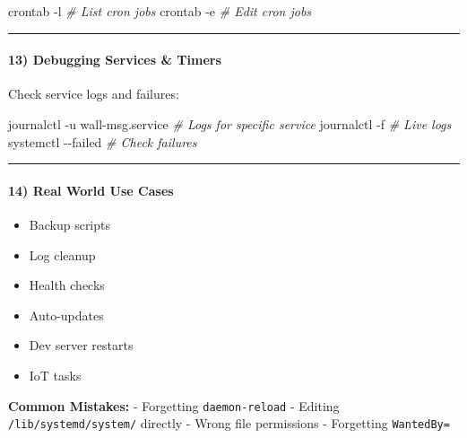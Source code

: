 \documentclass[
  english,
  paper=a4,
  oneside  ,captions=tableheading
]{scrartcl}
\newenvironment{Shaded}{}{}
\newcommand{\AttributeTok}[1]{\textcolor[rgb]{0.49,0.56,0.16}{#1}}
\newcommand{\CommentTok}[1]{\textcolor[rgb]{0.38,0.63,0.69}{\textit{#1}}}
\newcommand{\ExtensionTok}[1]{#1}
\newcommand{\FunctionTok}[1]{\textcolor[rgb]{0.02,0.16,0.49}{#1}}
\newcommand{\NormalTok}[1]{#1}
\providecommand{\tightlist}{%
  \setlength{\itemsep}{0pt}\setlength{\parskip}{0pt}}
\begin{document}
\begin{Shaded}
\begin{Highlighting}[]
\FunctionTok{crontab} \AttributeTok{{-}l}      \CommentTok{\# List cron jobs}
\FunctionTok{crontab} \AttributeTok{{-}e}      \CommentTok{\# Edit cron jobs}
\end{Highlighting}
\end{Shaded}

\begin{center}\rule{0.5\linewidth}{0.5pt}\end{center}

\paragraph{13) Debugging Services \&
Timers}\label{debugging-services-timers}

Check service logs and failures:

\begin{Shaded}
\begin{Highlighting}[]
\ExtensionTok{journalctl} \AttributeTok{{-}u}\NormalTok{ wall{-}msg.service    }\CommentTok{\# Logs for specific service}
\ExtensionTok{journalctl} \AttributeTok{{-}f}                     \CommentTok{\# Live logs}
\ExtensionTok{systemctl} \AttributeTok{{-}{-}failed}                \CommentTok{\# Check failures}
\end{Highlighting}
\end{Shaded}

\begin{center}\rule{0.5\linewidth}{0.5pt}\end{center}

\paragraph{14) Real World Use Cases}\label{real-world-use-cases}

\begin{itemize}
\tightlist
\item
  Backup scripts
\item
  Log cleanup
\item
  Health checks
\item
  Auto-updates
\item
  Dev server restarts
\item
  IoT tasks
\end{itemize}

\textbf{Common Mistakes:} - \faTimesCircle Forgetting
\texttt{daemon-reload} - \faTimesCircle Editing
\texttt{/lib/systemd/system/} directly - \faTimesCircle Wrong file
permissions - \faTimesCircle Forgetting \texttt{WantedBy=}
\end{document}
